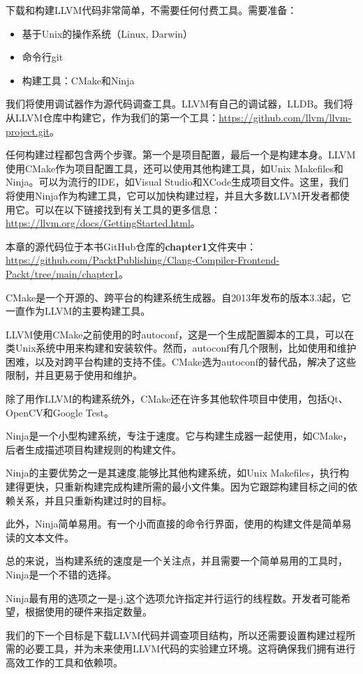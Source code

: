 下载和构建LLVM代码非常简单，不需要任何付费工具。需要准备：

\begin{itemize}
\item
基于Unix的操作系统（Linux, Darwin）

\item
命令行git

\item
构建工具：CMake和Ninja
\end{itemize}

我们将使用调试器作为源代码调查工具。LLVM有自己的调试器，LLDB。我们将从LLVM仓库中构建它，作为我们的第一个工具：\url{https://github.com/llvm/llvm-project.git}。

任何构建过程都包含两个步骤。第一个是项目配置，最后一个是构建本身。LLVM使用CMake作为项目配置工具，还可以使用其他构建工具，如Unix Makefiles和Ninja。可以为流行的IDE，如Visual Studio和XCode生成项目文件。这里，我们将使用Ninja作为构建工具，它可以加快构建过程，并且大多数LLVM开发者都使用它。可以在以下链接找到有关工具的更多信息：\url{https://llvm.org/docs/GettingStarted.html}。

本章的源代码位于本书GitHub仓库的\textbf{chapter1}文件夹中：\url{https://github.com/PacktPublishing/Clang-Compiler-Frontend-Packt/tree/main/chapter1}。


CMake是一个开源的、跨平台的构建系统生成器。自2013年发布的版本3.3起，它一直作为LLVM的主要构建工具。

LLVM使用CMake之前使用的时autoconf，这是一个生成配置脚本的工具，可以在类Unix系统中用来构建和安装软件。然而，autoconf有几个限制，比如使用和维护困难，以及对跨平台构建的支持不佳。CMake选为autoconf的替代品，解决了这些限制，并且更易于使用和维护。

除了用作LLVM的构建系统外，CMake还在许多其他软件项目中使用，包括Qt、OpenCV和Google Test。


Ninja是一个小型构建系统，专注于速度。它与构建生成器一起使用，如CMake，后者生成描述项目构建规则的构建文件。

Ninja的主要优势之一是其速度,能够比其他构建系统，如Unix Makefiles，执行构建得更快，只重新构建完成构建所需的最小文件集。因为它跟踪构建目标之间的依赖关系，并且只重新构建过时的目标。

此外，Ninja简单易用。有一个小而直接的命令行界面，使用的构建文件是简单易读的文本文件。

总的来说，当构建系统的速度是一个关注点，并且需要一个简单易用的工具时，Ninja是一个不错的选择。

Ninja最有用的选项之一是-j,这个选项允许指定并行运行的线程数。开发者可能希望，根据使用的硬件来指定数量。

我们的下一个目标是下载LLVM代码并调查项目结构，所以还需要设置构建过程所需的必要工具，并为未来使用LLVM代码的实验建立环境。这将确保我们拥有进行高效工作的工具和依赖项。






























